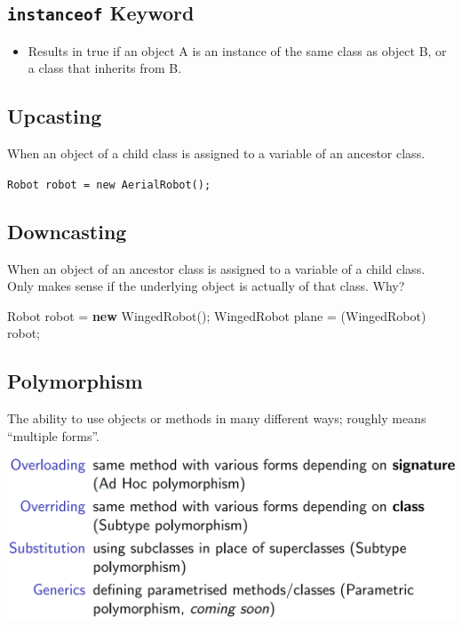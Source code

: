 \documentclass[]{article}
\newenvironment{Shaded}{}{}
\newcommand{\BuiltInTok}[1]{#1}
\newcommand{\FunctionTok}[1]{\textcolor[rgb]{0.02,0.16,0.49}{#1}}
\newcommand{\KeywordTok}[1]{\textcolor[rgb]{0.00,0.44,0.13}{\textbf{#1}}}
\newcommand{\NormalTok}[1]{#1}
\providecommand{\tightlist}{%
  \setlength{\itemsep}{0pt}\setlength{\parskip}{0pt}}
\begin{document}
\hypertarget{instanceof-keyword}{%
\subsection{\texorpdfstring{\texttt{instanceof}
Keyword}{instanceof Keyword}}\label{instanceof-keyword}}

\begin{itemize}
\tightlist
\item
  Results in true if an object A is an instance of the same class as
  object B, or a class that inherits from B.
\end{itemize}

\hypertarget{upcasting}{%
\subsection{Upcasting}\label{upcasting}}

When an object of a child class is assigned to a variable of an ancestor
class.

\texttt{Robot\ robot\ =\ new\ AerialRobot();}

\hypertarget{downcasting}{%
\subsection{Downcasting}\label{downcasting}}

When an object of an ancestor class is assigned to a variable of a child
class. Only makes sense if the underlying object is actually of that
class. Why?

\begin{Shaded}
\begin{Highlighting}[]
\BuiltInTok{Robot}\NormalTok{ robot = }\KeywordTok{new} \FunctionTok{WingedRobot}\NormalTok{();}
\NormalTok{WingedRobot plane = (WingedRobot) robot;}
\end{Highlighting}
\end{Shaded}

\hypertarget{polymorphism-1}{%
\subsection{Polymorphism}\label{polymorphism-1}}

The ability to use objects or methods in many different ways; roughly
means ``multiple forms''.

\includegraphics{images/polymorphism.png}
\end{document}
